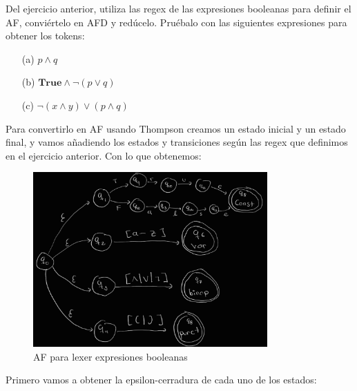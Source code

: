 \begin{Pro}
Del ejercicio anterior, utiliza las regex de las expresiones booleanas para definir el AF, conviértelo en AFD y redúcelo. Pruébalo con las siguientes expresiones para obtener los tokens:

\begin{enumerate}
    \item[(a)] $p \land q$
    \item[(b)] $\textbf{True} \land \lnot(p \lor q)$
    \item[(c)] $\lnot(x \land y) \lor (p \land q)$
\end{enumerate}

\end{Pro}


Para convertirlo en AF usando Thompson creamos un estado inicial y un estado final, y vamos añadiendo los estados y transiciones según las regex que definimos en el ejercicio anterior. Con lo que obtenemos:

\begin{figure}[H]
    \centering
    \includegraphics[width=0.8\textwidth]{images/ejercicio10-1.jpg}
    \caption{AF para lexer expresiones booleanas}
    \label{fig:my_label}
\end{figure}


Primero vamos a obtener la epsilon-cerradura de cada uno de los estados:

